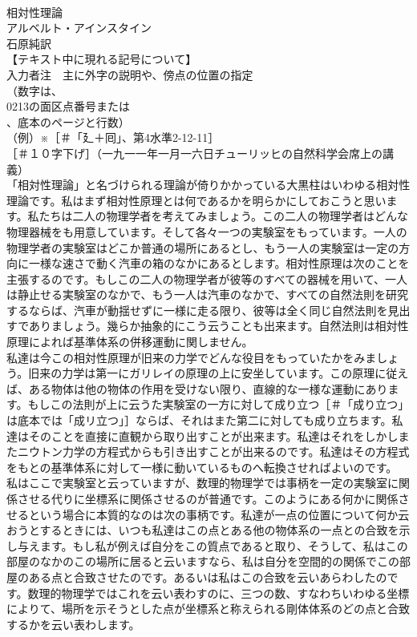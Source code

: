 \documentclass[8pt]{extreport}
\begin{document}
\begin{CJK}{UTF8}{min}
\\	相対性理論
\\	アルベルト・アインスタイン
\\	石原純訳
\\	【テキスト中に現れる記号について】
\\	入力者注　主に外字の説明や、傍点の位置の指定
\\	（数字は、
\\	0213の面区点番号または
\\	、底本のページと行数）
\\	（例）※［＃「廴＋囘」、第4水準2-12-11］
\\	［＃１０字下げ］（一九一一年一月一六日チューリッヒの自然科学会席上の講義）
\\	「相対性理論」と名づけられる理論が倚りかかっている大黒柱はいわゆる相対性理論です。私はまず相対性原理とは何であるかを明らかにしておこうと思います。私たちは二人の物理学者を考えてみましょう。この二人の物理学者はどんな物理器械をも用意しています。そして各々一つの実験室をもっています。一人の物理学者の実験室はどこか普通の場所にあるとし、もう一人の実験室は一定の方向に一様な速さで動く汽車の箱のなかにあるとします。相対性原理は次のことを主張するのです。もしこの二人の物理学者が彼等のすべての器械を用いて、一人は静止せる実験室のなかで、もう一人は汽車のなかで、すべての自然法則を研究するならば、汽車が動揺せずに一様に走る限り、彼等は全く同じ自然法則を見出すでありましょう。幾らか抽象的にこう云うことも出来ます。自然法則は相対性原理によれば基準体系の併移運動に関しません。
\\	私達は今この相対性原理が旧来の力学でどんな役目をもっていたかをみましょう。旧来の力学は第一にガリレイの原理の上に安坐しています。この原理に従えば、ある物体は他の物体の作用を受けない限り、直線的な一様な運動にあります。もしこの法則が上に云うた実験室の一方に対して成り立つ［＃「成り立つ」は底本では「成リ立つ」］ならば、それはまた第二に対しても成り立ちます。私達はそのことを直接に直観から取り出すことが出来ます。私達はそれをしかしまたニウトン力学の方程式からも引き出すことが出来るのです。私達はその方程式をもとの基準体系に対して一様に動いているものへ転換させればよいのです。
\\	私はここで実験室と云っていますが、数理的物理学では事柄を一定の実験室に関係させる代りに坐標系に関係させるのが普通です。このようにある何かに関係させるという場合に本質的なのは次の事柄です。私達が一点の位置について何か云おうとするときには、いつも私達はこの点とある他の物体系の一点との合致を示し与えます。もし私が例えば自分をこの質点であると取り、そうして、私はこの部屋のなかのこの場所に居ると云いますなら、私は自分を空間的の関係でこの部屋のある点と合致させたのです。あるいは私はこの合致を云いあらわしたのです。数理的物理学ではこれを云い表わすのに、三つの数、すなわちいわゆる坐標によりて、場所を示そうとした点が坐標系と称えられる剛体体系のどの点と合致するかを云い表わします。

\end{CJK}
\end{document}
